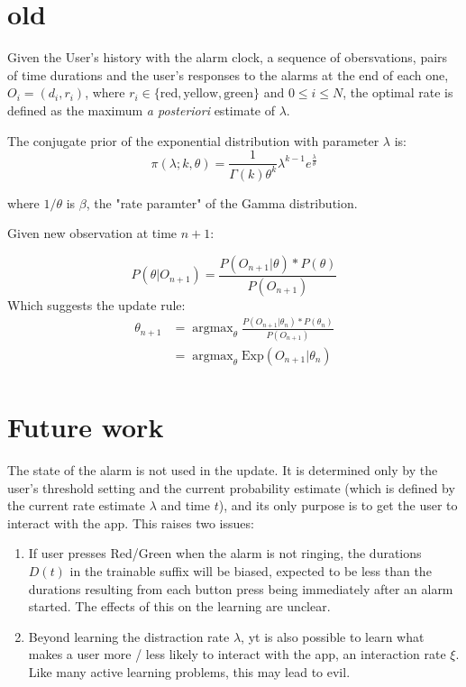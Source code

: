 \documentclass{article}
\DeclareMathOperator*{\argmax}{argmax}
\begin{document}
\section{old}

Given the User's history with the alarm clock, a sequence of obersvations, pairs of time durations and the user's responses to the alarms at the end of each one, $O_i = (d_i, r_i)$, where $r_i \in \{ \text{red},\text{yellow}, \text{green}\}$ and $0\leq i\leq N$, the optimal rate  is defined as the maximum \emph{a posteriori} estimate of $\lambda$.

The conjugate prior of the exponential distribution with parameter $\lambda$ is:
$$
 \pi(\lambda;k, \theta) = \frac{1}{\Gamma(k)\theta^k}\lambda^{k-1} e^\frac{\lambda}{\theta} 
$$

where $1/\theta$ is $\beta$,  the "rate paramter" of the Gamma distribution.

Given new observation at time $n+1$:

$$
P(\theta|O_{n+1}) = \frac{P(O_{n+1}|\theta) * P(\theta)}{P(O_{n+1})}
$$
Which suggests the update rule:
\begin{align}\label{eqn}
\theta_{n+1} &= \argmax_{\theta}   \frac{P(O_{n+1}|\theta_n) * P(\theta_n)}{P(O_{n+1})}\nonumber\\
 &= \argmax_{\theta} \text{Exp}(O_{n+1}|\theta_n)  \\ 
\end{align}
\section{Future work}
The state of the alarm is not used in the update.  It is determined only by the user's threshold setting and the current probability estimate (which is defined by the current rate estimate $\lambda$ and time $t$), and its only purpose is to get the user to interact with the app.  This raises two issues:
\begin{enumerate}
\item If user presses Red/Green when the alarm is not ringing, the durations $D(t)$ in the trainable suffix will be biased, expected to be less than the durations resulting from each button press being immediately after an alarm started.  The effects of this on the learning are unclear.


\item Beyond learning the distraction rate $\lambda$, yt is also possible to learn what makes a user more / less likely to interact with the app, an interaction rate $\xi$.  Like many active learning problems, this may lead to evil.
\end{enumerate}
\end{document}
